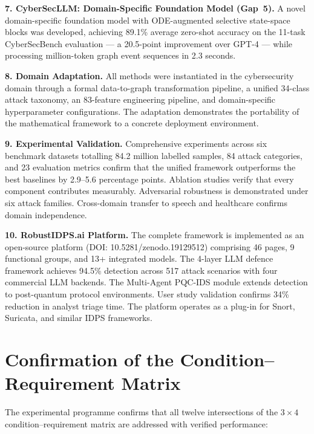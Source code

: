 \noindent\textbf{7. CyberSecLLM: Domain-Specific Foundation Model (Gap~5).}
A novel domain-specific foundation model with ODE-augmented selective state-space blocks was developed, achieving 89.1\% average zero-shot accuracy on the 11-task CyberSecBench evaluation --- a 20.5-point improvement over GPT-4 --- while processing million-token graph event sequences in 2.3 seconds.

\noindent\textbf{8. Domain Adaptation.}
All methods were instantiated in the cybersecurity domain through a formal data-to-graph transformation pipeline, a unified 34-class attack taxonomy, an 83-feature engineering pipeline, and domain-specific hyperparameter configurations. The adaptation demonstrates the portability of the mathematical framework to a concrete deployment environment.

\noindent\textbf{9. Experimental Validation.}
Comprehensive experiments across six benchmark datasets totalling 84.2 million labelled samples, 84 attack categories, and 23 evaluation metrics confirm that the unified framework outperforms the best baselines by 2.9--5.6 percentage points. Ablation studies verify that every component contributes measurably. Adversarial robustness is demonstrated under six attack families. Cross-domain transfer to speech and healthcare confirms domain independence.

\noindent\textbf{10. RobustIDPS.ai Platform.}
The complete framework is implemented as an open-source platform (DOI: 10.5281/zenodo.19129512) comprising 46 pages, 9 functional groups, and 13+ integrated models. The 4-layer LLM defence framework achieves 94.5\% detection across 517 attack scenarios with four commercial LLM backends. The Multi-Agent PQC-IDS module extends detection to post-quantum protocol environments. User study validation confirms 34\% reduction in analyst triage time. The platform operates as a plug-in for Snort, Suricata, and similar IDPS frameworks.


\section*{Confirmation of the Condition--Requirement Matrix}

The experimental programme confirms that all twelve intersections of the $3\times4$ condition--requirement matrix are addressed with verified performance:

